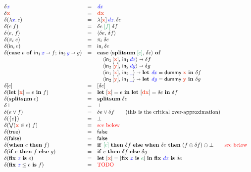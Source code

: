 \documentclass{article}
\newcommand{\dummy}{\ms{dummy}}
\begin{document}
\[
\begin{array}{lcll}
  \delta \m{x} &=& \m{dx}\\
  \delta \d{x} &=& \d{dx}\\
  \delta(\fn\bind{\m{x}} e) &=&
  \fn\bind{\disc{\d{x}} \, \m{dx}} \delta e\\
  \delta(e\;f) &=& \delta e \; \preserve{f} \; \delta f\\
  \delta \pair{e}{f} &=& \pair{\delta{e}}{\delta{f}}\\
  \delta(\pi_i\; e) &=& \pi_i\; \delta{e}\\
  \delta(\inj{i}{e}) &=& \inj{i}{\delta{e}}\\

  \delta(\case{e}{\m x}{f}{\m y}{g})
  &=& \mathbf{case} \; \pair{\splitsum{\preserve{e}}}{\delta e} ~\mathbf{of}\\
   && \quad \pair{\inj{1}{\disc{\d{x}}}}{\inj{1}{\m{dx}}} \cto \delta f\\
   && \quad \pair{\inj{2}{\disc{\d{y}}}}{\inj{2}{\m{dy}}} \cto \delta g\\
   && \quad \pair{\inj{1}{\disc{\d{x}}}}{\inj{2}{\m{\pwild}}} \cto
      \letv{\m{dx}}{\dummy\; \d{x}} \delta f\\
   && \quad \pair{\inj{2}{\disc{\d{y}}}}{\inj{1}{\m{\pwild}}} \cto
      \letv{\m{dy}}{\dummy\; \d{y}} \delta g\\

  \delta\disc{e} &=& \disc{\delta e}\\
  \delta(\letdisc{\d{x}}{e} f) &=&
    \letdisc{\d{x}}{e} \letdisc{\d{dx}}{\delta e} \delta f\\

  \delta(\splitsum{e}) &=&
  \splitsum{\delta e}\\
  \delta \unit &=& \unit\\
  \delta(e \vee f) &=& \delta e \vee \delta f
  \qquad \text{(this is the critical over-approximation)}\\
  \delta(\single{e}) &=& \unit\\
  \delta(\setelim{\d{x}}{e}{f}) &=& \text{\todo{see below}}\\
  \delta(\etrue) &=& \efalse\\
  \delta(\efalse) &=& \efalse\\
  \delta(\when{e}{f})
  &=& \ifthen{\preserve{e}}{\delta f}{
    \when{\delta e}{(f \oplus \delta f) \ominus \unit}}
  \qquad \text{\color{red} see below}\\
  \delta(\ifthen{e}{f}{g}) &=& \ifthen{e}{\delta f}{\delta g}\\
  \delta(\fix{\m{x}}{e}) &=&
  \letdisc{\d{x}}
          {\disc{\fix{\m{x}} {\color{ForestGreen}e}}}
          {\fix{\m{dx}} \delta e}\\
  \delta(\fixle{\m{x}}{e}{f}) &=& \text{\TODO}
\end{array}
\]
\end{document}
